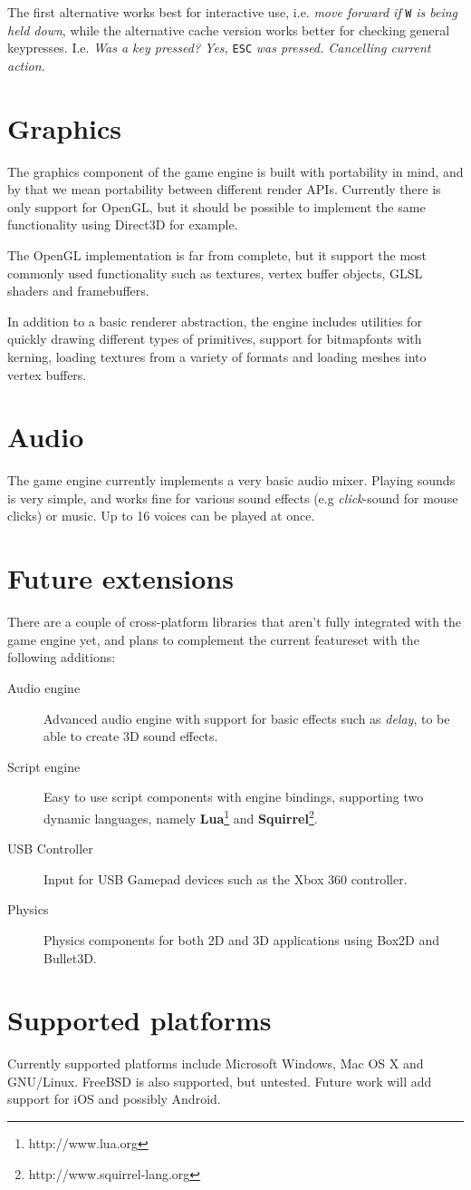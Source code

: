 The first alternative works best for interactive use, i.e. \textit{move forward if} \texttt{W} \textit{is being held down}, while the alternative cache version works better for checking general keypresses. I.e. \textit{Was a key pressed? Yes, }\texttt{ESC} \textit{was pressed. Cancelling current action.}
 
\section{Graphics}
The graphics component of the game engine is built with portability in mind, and by that we mean portability
between different render APIs. Currently there is only support for OpenGL, but it should be possible to implement the same functionality using Direct3D for example.

The OpenGL implementation is far from complete, but it support the most commonly used functionality such as textures, vertex buffer objects, GLSL shaders and framebuffers.

In addition to a basic renderer abstraction, the engine includes utilities for quickly drawing different types of primitives, support for bitmapfonts with kerning, loading textures from a variety of formats and loading meshes into vertex buffers.

\section{Audio}
The game engine currently implements a very basic audio mixer. Playing sounds is very simple, and works fine
for various sound effects (e.g \textit{click}-sound for mouse clicks) or music. Up to 16 voices can be played at once.

\section{Future extensions}
There are a couple of cross-platform libraries that aren't fully integrated with the game engine yet, and plans to complement the current featureset with the following additions:
\begin{description}
\item[Audio engine] Advanced audio engine with support for basic effects such as \textit{delay}, to be able to create 3D sound effects.
\item[Script engine] Easy to use script components with engine bindings, \mbox{supporting} two dynamic languages, namely \textbf{Lua}\footnote{http://www.lua.org} and \textbf{Squirrel}\footnote{http://www.squirrel-lang.org}.
\item[USB Controller] Input for USB Gamepad devices such as the Xbox 360 controller.
\item[Physics] Physics components for both 2D and 3D applications using Box2D and Bullet3D.
\end{description}
\section{Supported platforms}
Currently supported platforms include Microsoft Windows, Mac OS X and GNU/Linux. FreeBSD is also supported, but untested. Future work will add support for iOS and possibly Android.


